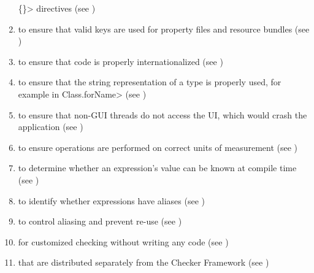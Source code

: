 \begin{enumerate}
  \<\{\}> directives (see )
\item
   to ensure that valid
  keys are used for property files and resource bundles (see
  )
\item
   to
  ensure that code is properly internationalized (see
  )
\item
   to ensure that the
  string representation of a type is properly used, for example in
  \<Class.forName> (see )
\item
   to ensure that non-GUI
  threads do not access the UI, which would crash the application
  (see )
\item
   to ensure operations are
  performed on correct units of measurement
  (see )
\item
   to determine
  whether an expression's value can be known at compile time
  (see )
\item
   to identify whether
  expressions have aliases (see )
\item
   to control aliasing and prevent
  re-use (see )
\item
   for customized checking without
  writing any code (see )
\item
   that are distributed
  separately from the Checker Framework
  (see )

\end{enumerate}

